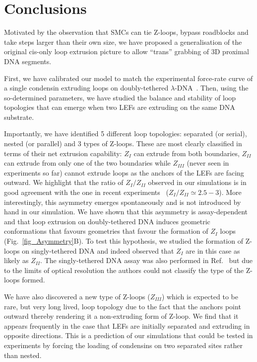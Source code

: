 \documentclass[aps,prl,twocolumn,a4paper,10pt,notitlepage,footinbib,nobalancelastpage,superscriptaddress,showpacs,floatfix]{revtex4-1}%
\begin{document}
\section{Conclusions}

Motivated by the observation that SMCs can tie Z-loops, bypass roadblocks and take steps larger than their own size, we have proposed a generalisation of the original cis-only loop extrusion picture to allow ``trans'' grabbing of 3D proximal DNA segments.

First, we have calibrated our model to match the experimental force-rate curve of  a single condensin extruding loops on doubly-tethered $\lambda$-DNA~\cite{Ganji2018}. Then, using the so-determined parameters, we have studied the balance and stability of loop topologies that can emerge when two LEFs are extruding on the same DNA substrate.  
 
Importantly, we have identified 5 different loop topologies: separated (or serial), nested (or parallel) and 3 types of Z-loops. These are most clearly classified in terms of their net extrusion capability: $Z_I$ can extrude from both boundaries, $Z_{II}$ can extrude from only one of the two boundaries while $Z_{III}$ (never seen in experiments so far) cannot extrude loops as the anchors of the LEFs are facing outward. We highlight that the ratio of $Z_{I}/Z_{II}$ observed in our simulations is in good agreement with the one in recent experiments~\cite{Kim2020} ($Z_{I}/Z_{II} \simeq 2.5-3$). More interestingly, this asymmetry emerges spontaneously  and is not introduced by hand in our simulation. We have shown that this asymmetry is assay-dependent and that loop extrusion on doubly-tethered DNA induces geometric conformations that favours geometries that favour the formation of $Z_I$ loops (Fig.~\ref{fig_Asymmetry}B). To test this hypothesis, we studied the formation of Z-loops on singly-tethered DNA and indeed observed that $Z_I$ are in this case as likely as $Z_{II}$. The singly-tethered DNA assay was also performed in Ref.~\cite{Kim2020} but due to the limits of optical resolution the authors could not classify the type of the Z-loops formed. 

We have also discovered a new type of Z-loops ($Z_{III}$) which is expected to be rare, but very long lived, loop topology due to the fact that the anchors point outward thereby rendering it a non-extruding form of Z-loop. We find that it appears frequently in the case that LEFs are initially separated and extruding in opposite directions. This is a prediction of our simulations that could be tested in experiments by forcing the loading of condensins on two separated sites rather than nested.  
\end{document}
